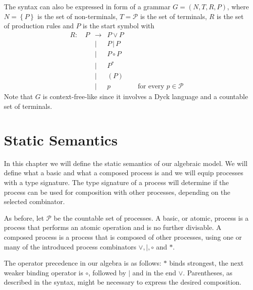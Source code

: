 The syntax can also be expressed in form of a grammar $G = \left( N, T, R, P \right)$, where $N = \left\{ P \right\}$ is the set of non-terminals, $T = \mathcal{P}$ is the set of terminals, $R$ is the set of production rules and $P$ is the start symbol \cite{Hopcroft:2006:IAT:1196416} with %
\begin{eqnarray*}
  R \colon \quad P & \to & P \vee P \\
    & | & P \,|\, P \\
    & | & P \circ P \\
    & | & P^* \\
    & | & \left( P \right) \\
    & | & p \quad\quad\quad\quad \text{for every } p \in \mathcal{P}
\end{eqnarray*}
Note that $G$ is context-free-like since it involves a Dyck language \cite{} and a countable set of terminals.






\section{Static Semantics}
\label{chp:static_semantics}
In this chapter we will define the static semantics of our algebraic model. We will define what a basic and what a composed process is and we will equip processes with a type signature. The type signature of a process will determine if the process can be used for composition with other processes, depending on the selected combinator.

As before, let $\mathcal{P}$ be the countable set of processes. A basic, or atomic, process is a process that performs an atomic operation and is no further divisable. A composed process is a process that is composed of other processes, using one or many of the introduced process combinators $\vee, |, \circ$ and $*$.

\begin{definition}
\label{def:operator_precedence}
The operator precedence in our algebra is as follows: $*$ binds strongest, the next weaker binding operator is $\circ$, followed by $|$ and in the end $\vee$. Parentheses, as described in the syntax, might be necessary to express the desired composition.

\hfill\qedsymbol
\end{definition}

